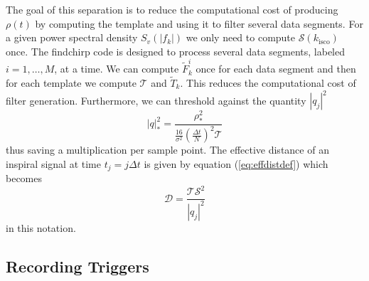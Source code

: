 The goal of this separation is to reduce the computational
cost of producing $\rho(t)$ by computing the template and using it to filter
several data segments. For a given power spectral density $S_v(|f_k|)$ we
only need to compute $\mathcal{S}(k_\mathrm{isco})$ once. The findchirp code
is designed to process several data segments, labeled $i = 1,\ldots,M$, at a
time. We can compute $\tilde{F}_k^i$ once for  each data segment and then for
each template we compute $\mathcal{T}$ and $\tilde{T}_k$. 
This reduces the computational cost of filter generation.
Furthermore, we can threshold against the quantity $|q_j|^2$
\begin{equation}
|q|^2_\ast = \frac{\rho^2_\ast} 
{\frac{16}{\sigma^2}\left(\frac{\Delta t}{N}\right)^2 \mathcal{T}}
\label{eq:qopstat}
\end{equation}
thus saving a multiplication per sample point.
The effective distance of an inspiral signal at time $t_j = j\Delta t$ is
given by equation (\ref{eq:effdistdef}) which becomes
\begin{equation}
\mathcal{D} = \frac{\mathcal{T}\mathcal{S}^2}{|q_j|^2}
\end{equation}
in this notation.

\subsection{Recording Triggers}
\label{ss:record}

